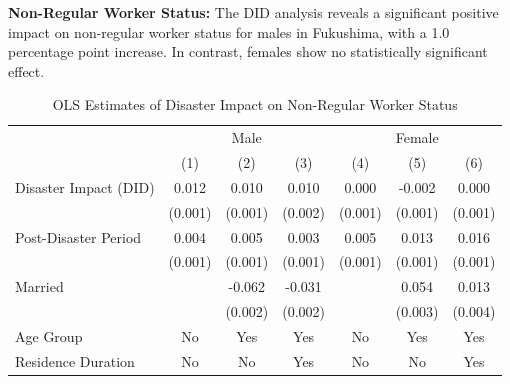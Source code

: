\documentclass[serif, aspectratio=169]{beamer}
\begin{document}
\begin{frame}[label=nonregular_status]

\textbf{Non-Regular Worker Status:} The DID analysis reveals a significant positive impact on non-regular worker status for males in Fukushima, with a 1.0 percentage point increase. In contrast, females show no statistically significant effect.

\begin{table}[htbp]
\centering
\caption{OLS Estimates of Disaster Impact on Non-Regular Worker Status}

\vspace{-0.2cm}


\begin{tabular}{@{}l*{6}{c}@{}}
          &\multicolumn{3}{c}{Male}                                &\multicolumn{3}{c}{Female}                              \\\cmidrule(lr){2-4}\cmidrule(lr){5-7}
          &\multicolumn{1}{c}{(1)}         &\multicolumn{1}{c}{(2)}         &\multicolumn{1}{c}{(3)}         &\multicolumn{1}{c}{(4)}         &\multicolumn{1}{c}{(5)}         &\multicolumn{1}{c}{(6)}         \\
\toprule
Disaster Impact (DID)&    0.012\sym{***}&    0.010\sym{***}&    0.010\sym{***}&    0.000         &   -0.002\sym{**} &    0.000         \\
          &  (0.001)         &  (0.001)         &  (0.002)         &  (0.001)         &  (0.001)         &  (0.001)         \\
\addlinespace
Post-Disaster Period&    0.004\sym{**} &    0.005\sym{***}&    0.003\sym{**} &    0.005\sym{***}&    0.013\sym{***}&    0.016\sym{***}\\
          &  (0.001)         &  (0.001)         &  (0.001)         &  (0.001)         &  (0.001)         &  (0.001)         \\
\addlinespace
Married   &                  &   -0.062\sym{***}&   -0.031\sym{***}&                  &    0.054\sym{***}&    0.013\sym{***}\\
          &                  &  (0.002)         &  (0.002)         &                  &  (0.003)         &  (0.004)         \\
\midrule
Age Group &       No         &      Yes         &      Yes         &       No         &      Yes         &      Yes         \\
Residence Duration&       No         &       No         &      Yes         &       No         &       No         &      Yes         \\

\end{tabular}
\end{table}
\end{frame}
\end{document}
